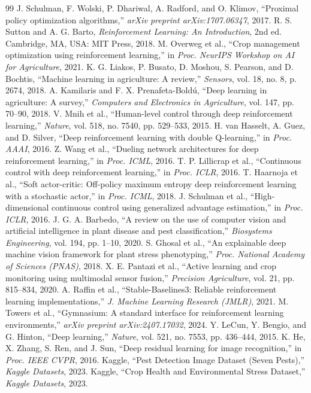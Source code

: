 \documentclass[12pt,a4paper]{report}
\begin{document}
\begin{thebibliography}{99}
 J. Schulman, F. Wolski, P. Dhariwal, A. Radford, and O. Klimov, “Proximal policy optimization algorithms,” \emph{arXiv preprint arXiv:1707.06347}, 2017.
 R. S. Sutton and A. G. Barto, \emph{Reinforcement Learning: An Introduction}, 2nd ed. Cambridge, MA, USA: MIT Press, 2018.
 M. Overweg et al., “Crop management optimization using reinforcement learning,” in \emph{Proc. NeurIPS Workshop on AI for Agriculture}, 2021.
 K. G. Liakos, P. Busato, D. Moshou, S. Pearson, and D. Bochtis, “Machine learning in agriculture: A review,” \emph{Sensors}, vol. 18, no. 8, p. 2674, 2018.
 A. Kamilaris and F. X. Prenafeta-Boldú, “Deep learning in agriculture: A survey,” \emph{Computers and Electronics in Agriculture}, vol. 147, pp. 70–90, 2018.
 V. Mnih et al., “Human-level control through deep reinforcement learning,” \emph{Nature}, vol. 518, no. 7540, pp. 529–533, 2015.
 H. van Hasselt, A. Guez, and D. Silver, “Deep reinforcement learning with double Q-learning,” in \emph{Proc. AAAI}, 2016.
 Z. Wang et al., “Dueling network architectures for deep reinforcement learning,” in \emph{Proc. ICML}, 2016.
 T. P. Lillicrap et al., “Continuous control with deep reinforcement learning,” in \emph{Proc. ICLR}, 2016.
 T. Haarnoja et al., “Soft actor-critic: Off-policy maximum entropy deep reinforcement learning with a stochastic actor,” in \emph{Proc. ICML}, 2018.
 J. Schulman et al., “High-dimensional continuous control using generalized advantage estimation,” in \emph{Proc. ICLR}, 2016.
 J. G. A. Barbedo, “A review on the use of computer vision and artificial intelligence in plant disease and pest classification,” \emph{Biosystems Engineering}, vol. 194, pp. 1–10, 2020.
 S. Ghosal et al., “An explainable deep machine vision framework for plant stress phenotyping,” \emph{Proc. National Academy of Sciences (PNAS)}, 2018.
 X. E. Pantazi et al., “Active learning and crop monitoring using multimodal sensor fusion,” \emph{Precision Agriculture}, vol. 21, pp. 815–834, 2020.
 A. Raffin et al., “Stable-Baselines3: Reliable reinforcement learning implementations,” \emph{J. Machine Learning Research (JMLR)}, 2021.
 M. Towers et al., “Gymnasium: A standard interface for reinforcement learning environments,” \emph{arXiv preprint arXiv:2407.17032}, 2024.
 Y. LeCun, Y. Bengio, and G. Hinton, “Deep learning,” \emph{Nature}, vol. 521, no. 7553, pp. 436–444, 2015.
 K. He, X. Zhang, S. Ren, and J. Sun, “Deep residual learning for image recognition,” in \emph{Proc. IEEE CVPR}, 2016.
 Kaggle, “Pest Detection Image Dataset (Seven Pests),” \emph{Kaggle Datasets}, 2023.
 Kaggle, “Crop Health and Environmental Stress Dataset,” \emph{Kaggle Datasets}, 2023.
\end{thebibliography}
\end{document}
